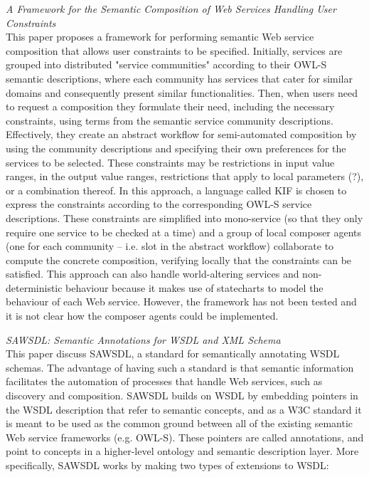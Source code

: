 \textit{A Framework for the Semantic Composition of Web Services Handling User Constraints \cite{gamha2008framework}}\\
This paper proposes a framework for performing semantic Web service composition that allows user constraints
to be specified. Initially, services are grouped into distributed "service communities" according to their OWL-S semantic descriptions,
where each community has services that cater for similar domains and consequently present similar functionalities.
Then, when users need to request a composition they formulate their need, including the necessary constraints, using
terms from the semantic service community descriptions. Effectively, they create an abstract workflow for semi-automated
composition by using the community descriptions and specifying their own preferences for the services to be selected.
These constraints may be restrictions in input value ranges, in the output value ranges, restrictions that apply to local
parameters (?), or a combination thereof. In this approach, a language called KIF is chosen to express the constraints according
to the corresponding OWL-S service descriptions. These constraints are simplified into mono-service (so that they only require
one service to be checked at a time) and a group of local composer agents (one for each community -- i.e. slot in the abstract
workflow) collaborate to compute the concrete composition, verifying locally that the constraints can be satisfied. This approach
can also handle world-altering services and non-deterministic behaviour because it makes use of statecharts to model the behaviour
of each Web service. However, the framework has not been tested and it is not clear how the composer agents could be implemented.

\textit{SAWSDL: Semantic Annotations for WSDL and XML Schema \cite{kopecky2007sawsdl}}\\
This paper discuss SAWSDL, a standard for semantically annotating WSDL schemas. The advantage of having such a standard is that semantic information facilitates the
automation of processes that handle Web services, such as discovery and composition. SAWSDL builds on WSDL by embedding pointers in the WSDL description that refer to
semantic concepts, and as a W3C standard it is meant to be used as the common ground between all of the existing semantic Web service frameworks (e.g. OWL-S). These
pointers are called annotations, and point to concepts in a higher-level ontology and semantic description layer. More specifically, SAWSDL works by making two types
of extensions to WSDL:


